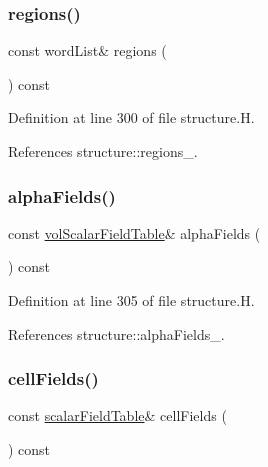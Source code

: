 \subsubsection{\texorpdfstring{regions()}{regions()}}
{\footnotesize\ttfamily const word\+List\& regions (\begin{DoxyParamCaption}{ }\end{DoxyParamCaption}) const\hspace{0.3cm}{\ttfamily [inline]}}



Definition at line 300 of file structure.\+H.



References structure\+::regions\+\_\+.

\mbox{\label{classFoam_1_1structure_aa8ba27c1f6cefdd2cf3456b668e3ebec}} 
\subsubsection{\texorpdfstring{alpha\+Fields()}{alphaFields()}}
{\footnotesize\ttfamily const \hyperlink{classFoam_1_1structure_a821486e30c5f9ed2852aeddc4ff8ff30}{vol\+Scalar\+Field\+Table}\& alpha\+Fields (\begin{DoxyParamCaption}{ }\end{DoxyParamCaption}) const\hspace{0.3cm}{\ttfamily [inline]}}



Definition at line 305 of file structure.\+H.



References structure\+::alpha\+Fields\+\_\+.

\mbox{\label{classFoam_1_1structure_a130f54cdf5e2e7bc9df67ac9ab50e6d9}} 
\subsubsection{\texorpdfstring{cell\+Fields()}{cellFields()}}
{\footnotesize\ttfamily const \hyperlink{classFoam_1_1structure_a2fdb5cf3126746b10e53fb86215f3249}{scalar\+Field\+Table}\& cell\+Fields (\begin{DoxyParamCaption}{ }\end{DoxyParamCaption}) const\hspace{0.3cm}{\ttfamily [inline]}}



